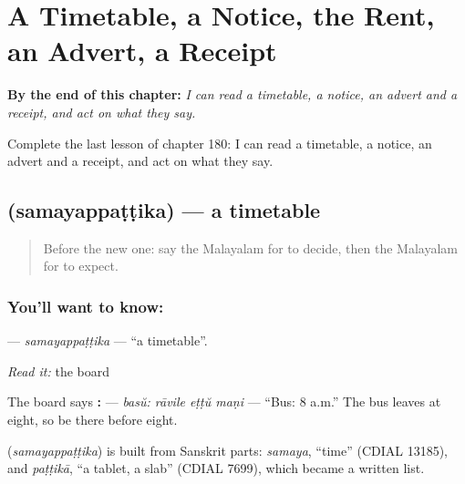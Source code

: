 
\chapter{A Timetable, a Notice, the Rent, an Advert, a Receipt}
\label{ch:ml-a-timetable-a-notice-the-rent-an-advert-a-receipt}

\begin{chapteropening}
\textbf{By the end of this chapter:} \emph{I can read a timetable, a notice, an advert and a receipt, and act on what they say.}

Complete the last lesson of chapter 180: I can read a timetable, a notice, an advert and a receipt, and act on what they say.
\end{chapteropening}

\section[\texorpdfstring{\ml{സമയപ്പട്ടിക} (samayappaṭṭika)}{സമയപ്പട്ടിക (samayappaṭṭika)}]{ (samayappaṭṭika) — a timetable}

\label{lesson:ML-C180-samayappattika}



\begin{quote}
Before the new one: say the Malayalam for to decide, then the Malayalam for to expect.
\end{quote}

\subsection*{You'll want to know: }
\textbf{} — \emph{samayappaṭṭika} — \textquotedblleft{}a timetable\textquotedblright{}.

\emph{Read it:} the board

The board says \textbf{:   } — \emph{basŭ: rāvile eṭṭŭ maṇi} — \textquotedblleft{}Bus: 8 a.m.\textquotedblright{} The bus leaves at eight, so be there before eight.

\begin{cousinweb}
\textbf{} (\emph{samayappaṭṭika}) is built from Sanskrit parts: \emph{samaya}, \textquotedblleft{}time\textquotedblright{} (CDIAL 13185), and \emph{paṭṭikā}, \textquotedblleft{}a tablet, a slab\textquotedblright{} (CDIAL 7699), which became a written list.
\end{cousinweb}

